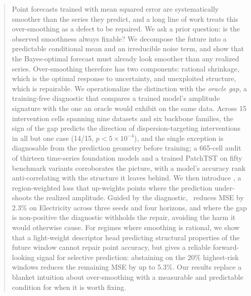 \begin{abstract}
Point forecasts trained with mean squared error are systematically smoother than the series they predict, and a long line of work treats this over-smoothing as a defect to be repaired. We ask a prior question: is the observed smoothness always fixable? We decompose the future into a predictable conditional mean and an irreducible noise term, and show that the Bayes-optimal forecast must already look smoother than any realized series. Over-smoothing therefore has two components: rational shrinkage, which is the optimal response to uncertainty, and unexploited structure, which is repairable. We operationalize the distinction with the \emph{oracle gap}, a training-free diagnostic that compares a trained model's amplitude signature with the one an oracle would exhibit on the same data. Across 15 intervention cells spanning nine datasets and six backbone families, the sign of the gap predicts the direction of dispersion-targeting interventions in all but one case (14/15, $p < 5\times 10^{-4}$), and the single exception is diagnosable from the prediction geometry before training; a 665-cell audit of thirteen time-series foundation models and a trained PatchTST on fifty benchmark variants corroborates the picture, with a model's accuracy rank anti-correlating with the structure it leaves behind. We then introduce \rfc, a region-weighted loss that up-weights points where the prediction under-shoots the realized amplitude. Guided by the diagnostic, \rfc~reduces MSE by 2.3\% on Electricity across three seeds and four horizons, and where the gap is non-positive the diagnostic withholds the repair, avoiding the harm it would otherwise cause. For regimes where smoothing is rational, we show that a light-weight descriptor head predicting structural properties of the future window cannot repair point accuracy, but gives a reliable forward-looking signal for selective prediction: abstaining on the 20\% highest-risk windows reduces the remaining MSE by up to 5.3\%. Our results replace a blanket intuition about over-smoothing with a measurable and predictable condition for when it is worth fixing.
\end{abstract}
